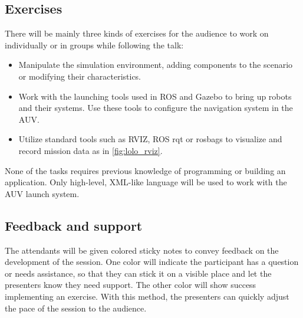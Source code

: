 \documentclass[
10pt, %
a4paper, %
oneside, %
headinclude,footinclude, %
BCOR5mm, %
]{scrartcl}
\begin{document}
\subsection{\textbf{Exercises}}
There will be mainly three kinds of exercises for the audience to work on individually or in groups while following the talk:

\begin{itemize}
	\item Manipulate the simulation environment, adding components to the scenario or modifying their characteristics.
	\item Work with the launching tools used in ROS and Gazebo to bring up robots and their systems. 
	Use these tools to configure the navigation system in the AUV.
	\item Utilize standard tools such as RVIZ, ROS rqt or rosbags to visualize and record mission data as in \ref{fig:lolo_rviz}.
\end{itemize}

None of the tasks requires previous knowledge of programming or building an application.
Only high-level, XML-like language will be used to work with the AUV launch system.

\subsection{\textbf{Feedback and support}}
The attendants will be given colored sticky notes to convey feedback on the development of the session. 
One color will indicate the participant has a question or needs assistance, so that they can stick it on a visible place and let the presenters know they need support.
The other color will show success implementing an exercise.
With this method, the presenters can quickly adjust the pace of the session to the audience.



\end{document}
